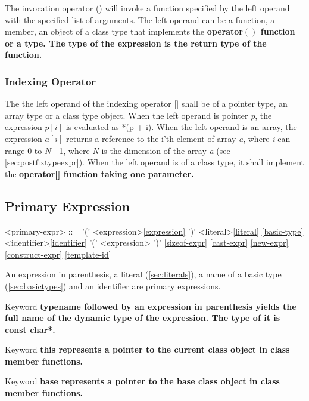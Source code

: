 \documentclass[a4paper,oneside,11pt]{article}
\begin{document}
The invocation operator () will invoke a function specified by the left operand with the specified list of arguments.
The left operand can be a function, a member, an object of a class type that implements the \bf{operator$()$} function or a type.
The type of the expression is the return type of the function.

\subsubsection{Indexing Operator}\label{indexing}

The the left operand of the indexing operator [] shall be of a pointer type, an array type or a class type object.
When the left operand is pointer \emph{p}, the expression $p[i]$ is evaluated as *(p + i).
When the left operand is an array, the expression $a[i]$ returns a reference to the i'th element of array \emph{a},
where \emph{i} can range 0 to \emph{N} - 1, where \emph{N} is the dimension of the array \emph{a} (see \ref{sec:postfixtypeexpr}).
When the left operand is of a class type, it shall implement the \bf{operator[]} function taking one parameter.

\subsection{Primary Expression}

\begin{grammar}
\label{primary-expr}<primary-expr> ::= '(' <expression>\ref{expression} ')'
\alt <literal>\ref{literal}
\ref{basic-type}
\alt <identifier>\ref{identifier}
\alt {} '(' <expression> ')'
\alt {}
\alt {}
\ref{sizeof-expr}
\ref{cast-expr}
\ref{new-expr}
\ref{construct-expr}
\ref{template-id}
\end{grammar}

An expression in parenthesis, a literal (\ref{sec:literals}), a name of a basic type (\ref{sec:basictypes}) and an identifier are primary expressions.

Keyword \bf{typename} followed by an expression in parenthesis yields the full name of the dynamic type of the expression.
The type of it is \bf{const char*}.

Keyword \bf{this} represents a pointer to the current class object in class member functions.

Keyword \bf{base} represents a pointer to the base class object in class member functions.
\end{document}
